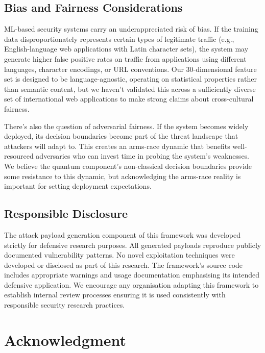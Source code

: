 \documentclass[journal,onecolumn]{IEEEtran}
\begin{document}
\subsection{Bias and Fairness Considerations}

ML-based security systems carry an underappreciated risk of bias. If the training data disproportionately represents certain types of legitimate traffic (e.g., English-language web applications with Latin character sets), the system may generate higher false positive rates on traffic from applications using different languages, character encodings, or URL conventions. Our 30-dimensional feature set is designed to be language-agnostic, operating on statistical properties rather than semantic content, but we haven't validated this across a sufficiently diverse set of international web applications to make strong claims about cross-cultural fairness.

There's also the question of adversarial fairness. If the system becomes widely deployed, its decision boundaries become part of the threat landscape that attackers will adapt to. This creates an arms-race dynamic that benefits well-resourced adversaries who can invest time in probing the system's weaknesses. We believe the quantum component's non-classical decision boundaries provide some resistance to this dynamic, but acknowledging the arms-race reality is important for setting deployment expectations.

\subsection{Responsible Disclosure}

The attack payload generation component of this framework was developed strictly for defensive research purposes. All generated payloads reproduce publicly documented vulnerability patterns. No novel exploitation techniques were developed or disclosed as part of this research. The framework's source code includes appropriate warnings and usage documentation emphasising its intended defensive application. We encourage any organisation adapting this framework to establish internal review processes ensuring it is used consistently with responsible security research practices.

\section*{Acknowledgment}
\end{document}
